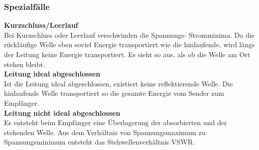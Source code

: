 	\subsubsection{Spezialfälle}
		\textbf{Kurzschluss/Leerlauf}\\
			Bei Kurzschluss oder Leerlauf verschwinden die Spannungs- Stromminima.
			Da die rückläufige Welle eben soviel Energie transportiert wie die hinlaufende, wird längs der Leitung keine Energie transportiert.
			Es sieht so aus, als ob die Welle am Ort stehen bleibt.\\
		\textbf{Leitung ideal abgeschlossen}\\
			Ist die Leitung ideal abgeschlossen, existiert keine reflektierende Welle.
			Die hinlaufende Welle transportiert so die gesamte Energie vom Sender zum Empfänger.\\
		\textbf{Leitung nicht ideal abgeschlossen}\\
			Es entsteht beim Empfänger eine Überlagerung der absorbierten und der stehenden Welle.
			Aus dem Verhältnis von Spannungsmaximum zu Spannungsminimum entsteht das Stehwellenverhältnis VSWR.
